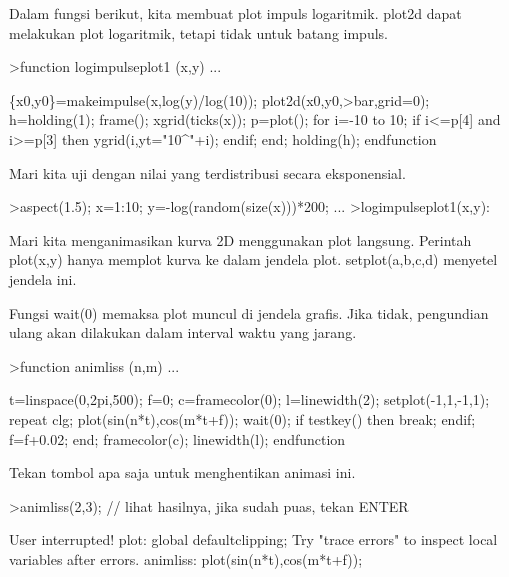 \begin{eulernotebook}
\begin{eulercomment}
Dalam fungsi berikut, kita membuat plot impuls logaritmik. plot2d
dapat melakukan plot logaritmik, tetapi tidak untuk batang impuls.
\end{eulercomment}
\begin{eulerprompt}
>function logimpulseplot1 (x,y) ...
\end{eulerprompt}
\begin{eulerudf}
    \{x0,y0\}=makeimpulse(x,log(y)/log(10));
    plot2d(x0,y0,>bar,grid=0);
    h=holding(1);
    frame();
    xgrid(ticks(x));
    p=plot();
    for i=-10 to 10;
      if i<=p[4] and i>=p[3] then
         ygrid(i,yt="10^"+i);
      endif;
    end;
    holding(h);
  endfunction
\end{eulerudf}
\begin{eulercomment}
Mari kita uji dengan nilai yang terdistribusi secara eksponensial.
\end{eulercomment}
\begin{eulerprompt}
>aspect(1.5); x=1:10; y=-log(random(size(x)))*200; ...
>logimpulseplot1(x,y):
\end{eulerprompt}
\begin{eulercomment}
Mari kita menganimasikan kurva 2D menggunakan plot langsung. Perintah
plot(x,y) hanya memplot kurva ke dalam jendela plot. setplot(a,b,c,d)
menyetel jendela ini.

Fungsi wait(0) memaksa plot muncul di jendela grafis. Jika tidak,
pengundian ulang akan dilakukan dalam interval waktu yang jarang.
\end{eulercomment}
\begin{eulerprompt}
>function animliss (n,m) ...
\end{eulerprompt}
\begin{eulerudf}
  t=linspace(0,2pi,500);
  f=0;
  c=framecolor(0);
  l=linewidth(2);
  setplot(-1,1,-1,1);
  repeat
    clg;
    plot(sin(n*t),cos(m*t+f));
    wait(0);
    if testkey() then break; endif;
    f=f+0.02;
  end;
  framecolor(c);
  linewidth(l);
  endfunction
\end{eulerudf}
\begin{eulercomment}
Tekan tombol apa saja untuk menghentikan animasi ini.
\end{eulercomment}
\begin{eulerprompt}
>animliss(2,3); // lihat hasilnya, jika sudah puas, tekan ENTER
\end{eulerprompt}
\begin{euleroutput}
  User interrupted!
  plot:
      global defaultclipping;
  Try "trace errors" to inspect local variables after errors.
  animliss:
      plot(sin(n*t),cos(m*t+f));\\
      

\end{euleroutput}
\end{eulernotebook}
